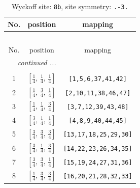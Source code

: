 \documentclass[fleqn,8pt]{jsarticle}
\begin{document}
\begin{longtable}{ccc}
\caption{Wyckoff site: {\tt 8b}, site symmetry: {\tt .-3.}}
 \\
 \hline \hline
No. & position & mapping \\ \hline \endfirsthead

\multicolumn{2}{l}{\tablename\ \thetable{}} \\
 \hline \hline
No. & position & mapping \\ \hline \endhead

 \hline \hline
\multicolumn{2}{r}{\footnotesize\it continued ...} \\ \endfoot

 \hline \hline
\multicolumn{2}{r}{} \\ \endlastfoot

1 & $\left[ \frac{1}{4},\, \frac{1}{4},\, \frac{1}{4} \right]$ & {\tt [1,5,6,37,41,42]} \\ \hline
2 & $\left[ \frac{1}{4},\, \frac{3}{4},\, \frac{1}{4} \right]$ & {\tt [2,10,11,38,46,47]} \\ \hline
3 & $\left[ \frac{1}{4},\, \frac{1}{4},\, \frac{3}{4} \right]$ & {\tt [3,7,12,39,43,48]} \\ \hline
4 & $\left[ \frac{3}{4},\, \frac{1}{4},\, \frac{1}{4} \right]$ & {\tt [4,8,9,40,44,45]} \\ \hline
5 & $\left[ \frac{3}{4},\, \frac{3}{4},\, \frac{3}{4} \right]$ & {\tt [13,17,18,25,29,30]} \\ \hline
6 & $\left[ \frac{3}{4},\, \frac{1}{4},\, \frac{3}{4} \right]$ & {\tt [14,22,23,26,34,35]} \\ \hline
7 & $\left[ \frac{3}{4},\, \frac{3}{4},\, \frac{1}{4} \right]$ & {\tt [15,19,24,27,31,36]} \\ \hline
8 & $\left[ \frac{1}{4},\, \frac{3}{4},\, \frac{3}{4} \right]$ & {\tt [16,20,21,28,32,33]} \\
\end{longtable}
\renewcommand{\arraystretch}{1.2}
\end{document}
